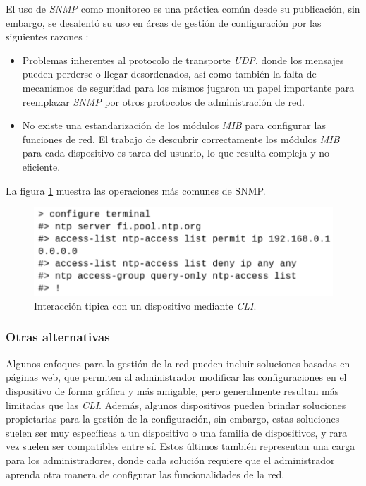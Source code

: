   El uso de \textit{SNMP} como monitoreo es una práctica común desde su publicación, sin embargo, se desalentó su uso en áreas de gestión de configuración por las siguientes razones \parencite{snmplimitacion}: 

  \begin{itemize}
	\item Problemas inherentes al protocolo de transporte \textit{UDP}, donde los mensajes pueden perderse o llegar desordenados, así como también la falta de mecanismos de seguridad para los mismos jugaron un papel importante para reemplazar \textit{SNMP} por otros protocolos de administración de red.
	\item No existe una estandarización de los módulos \textit{MIB} para configurar las funciones de red. El trabajo de descubrir correctamente los módulos \textit{MIB} para cada dispositivo es tarea del usuario, lo que resulta compleja y no eficiente.
\end{itemize}

La figura \ref{fig:snmpfig} muestra las operaciones más comunes de SNMP.

\begin{figure}[htbp]
	\centering
	\includegraphics[scale=0.6]{Figures/cli.pdf}
	\caption{Interacción tipica con un dispositivo mediante \textit{CLI}.}
	\label{fig:snmpfig}
  \end{figure}

\subsubsection{Otras alternativas}
Algunos enfoques para la gestión de la red pueden incluir soluciones basadas en páginas web, que permiten al administrador modificar las configuraciones en el dispositivo de forma gráfica y más amigable, pero generalmente resultan más limitadas que las \textit{CLI}. 
Además, algunos dispositivos pueden brindar soluciones propietarias para la gestión de la configuración, sin embargo, estas soluciones suelen ser muy específicas a un dispositivo o una familia de dispositivos, y rara vez suelen ser compatibles entre sí. Estos últimos también representan una carga para los administradores, donde cada solución requiere que el administrador aprenda otra manera de configurar las funcionalidades de la red.  

